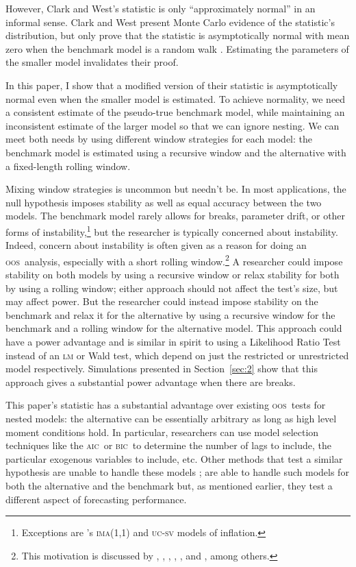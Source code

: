 \documentclass[11pt,fleqn]{article}
\newcommand\citepos[2][]{\citeauthor{#2}'s \citeyearpar[#1]{#2}}
\theoremstyle{definition}
\newcommand{\aic}{\textsc{aic}}
\newcommand{\bic}{\textsc{bic}}
\newcommand{\oos}{\textsc{oos}}
\begin{document}
However, Clark and West's statistic is only ``approximately normal''
in an informal sense.  Clark and West present Monte Carlo evidence of
the statistic's distribution, but only prove that the statistic is
asymptotically normal with mean zero when the benchmark model is a
random walk \citep{ClW:06}. Estimating the parameters of the smaller
model invalidates their proof.

In this paper, I show that a modified version of their statistic is
asymptotically normal even when the smaller model is estimated.  To
achieve normality, we need a consistent estimate of the pseudo-true
benchmark model, while maintaining an inconsistent estimate of the
larger model so that we can ignore nesting.  We can meet both needs by
using different window strategies for each model: the benchmark model
is estimated using a recursive window and the alternative with a
fixed-length rolling window.

Mixing window strategies is uncommon but needn't be. In most
applications, the null hypothesis imposes stability as well as equal
accuracy between the two models.  The benchmark model rarely allows
for breaks, parameter drift, or other forms of
instability,\footnote{Exceptions are \citepos{StW:07}
  \textsc{ima}(1,1) and \textsc{uc-sv} models of inflation.} but the
researcher is typically concerned about instability.  Indeed, concern
about instability is often given as a reason for doing an \oos\
analysis, especially with a short rolling window.\footnote{This
  motivation is discussed by \citet{StW:03}, \citet{PeT:05,PeT:07},
  \cite{GiW:06}, \citet{GoW:08}, \citet{ClM:09c}, and
  \cite{GiR:09,GiR:10}, among others.} A researcher could impose
stability on both models by using a recursive window or relax
stability for both by using a rolling window; either approach should
not affect the test's size, but may affect power.  But the researcher
could instead impose stability on the benchmark and relax it for the
alternative by using a recursive window for the benchmark and a
rolling window for the alternative model.  This approach could have a
power advantage and is similar in spirit to using a Likelihood Ratio
Test instead of an \textsc{lm} or Wald test, which depend on just the
restricted or unrestricted model respectively.  Simulations presented
in Section~\ref{sec:2} show that this approach gives a substantial
power advantage when there are breaks.

This paper's statistic has a substantial advantage over existing \oos\
tests for nested models: the alternative can be essentially arbitrary
as long as high level moment conditions hold.  In particular,
researchers can use model selection techniques like the \aic\ or \bic\
to determine the number of lags to include, the particular exogenous
variables to include, etc.  Other methods that test a similar
hypothesis are unable to handle these models \citep[except][which does
not allow the benchmark to be estimated]{ClW:06}; \citet{GiW:06} are
able to handle such models for both the alternative and the benchmark
but, as mentioned earlier, they test a different aspect of forecasting
performance.
\end{document}
